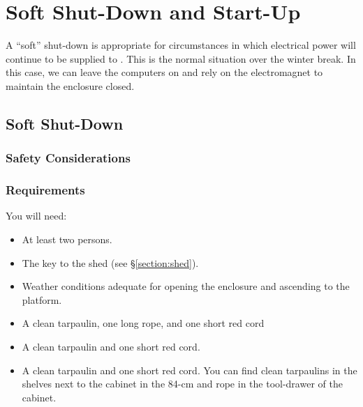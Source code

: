 \section{Soft Shut-Down and Start-Up}

A “soft” shut-down is appropriate for circumstances in which electrical power will continue to be supplied to {\projectname}. This is the normal situation over the winter break. In this case, we can leave the computers on and rely on the electromagnet to maintain the enclosure closed.

\subsection{Soft Shut-Down}
\label{section:soft-shut-down}

\subsubsection{Safety Considerations}





\subsubsection{Requirements}

You will need:
\begin{itemize}
    \item At least two persons.
    \item The key to the shed (see \S\ref{section:shed}).
    \item Weather conditions adequate for opening the enclosure and ascending to the platform.
        \ifddoti
    \item A clean tarpaulin, one long rope,  and one short red cord
        \fi
        \ifcoatli
    \item A clean tarpaulin and one short red cord.
        \fi
        \ifquetzalcoatl
    \item A clean tarpaulin and one short red cord.
        \fi
        You can find clean tarpaulins in the shelves next to the cabinet in the 84-cm and rope in the tool-drawer of the cabinet.
\end{itemize}

